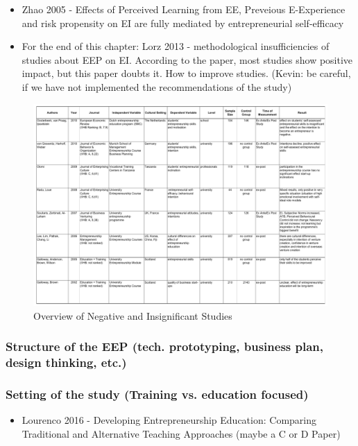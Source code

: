 \begin{itemize}
\item Zhao 2005 - Effects of Perceived Learning from EE, Preveious E-Experience and risk propensity on EI are fully mediated by entrepreneurial self-efficacy

\item For the end of this chapter: Lorz 2013 - methodological insufficiencies of studies about EEP on EI. According to the paper, most studies show positive impact, but this paper doubts it. How to improve studies. (Kevin: be careful, if we have not implemented the recommendations of the study)
\end{itemize}


\begin{figure}[h]
\begin{center}
\includegraphics[width=\textwidth]{images/table-negative-impact}
\caption{Overview of Negative and Insignificant Studies}
\label{fig:table-negative-impact}
\end{center}
\end{figure}

\subsubsection{Structure of the EEP (tech. prototyping, business plan, design thinking, etc.)}

\subsubsection{Setting of the study (Training vs. education focused)}

\begin{itemize}
\item Lourenco 2016 - Developing Entrepreneurship Education: Comparing Traditional and Alternative Teaching Approaches (maybe a C or D Paper)
\end{itemize}

